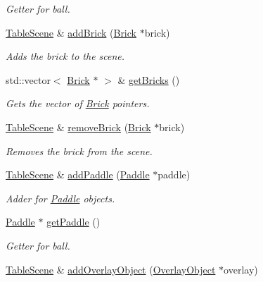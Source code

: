 \begin{DoxyCompactItemize}
\begin{DoxyCompactList}\small\item\em Getter for ball. \end{DoxyCompactList}\item 
\hyperlink{class_table_scene}{Table\+Scene} \& \hyperlink{class_table_scene_a617500b63b8d660a6f4f2807bb78a3e5}{add\+Brick} (\hyperlink{class_brick}{Brick} $\ast$brick)
\begin{DoxyCompactList}\small\item\em Adds the brick to the scene. \end{DoxyCompactList}\item 
std\+::vector$<$ \hyperlink{class_brick}{Brick} $\ast$ $>$ \& \hyperlink{class_table_scene_ab49b9da80894742da850699e9d09ae50}{get\+Bricks} ()
\begin{DoxyCompactList}\small\item\em Gets the vector of \hyperlink{class_brick}{Brick} pointers. \end{DoxyCompactList}\item 
\hyperlink{class_table_scene}{Table\+Scene} \& \hyperlink{class_table_scene_afea73d45fab7221c91177d9b7b385b63}{remove\+Brick} (\hyperlink{class_brick}{Brick} $\ast$brick)
\begin{DoxyCompactList}\small\item\em Removes the brick from the scene. \end{DoxyCompactList}\item 
\hypertarget{class_table_scene_abacaa9ebff0060101dfd63c948c661af}{\hyperlink{class_table_scene}{Table\+Scene} \& \hyperlink{class_table_scene_abacaa9ebff0060101dfd63c948c661af}{add\+Paddle} (\hyperlink{class_paddle}{Paddle} $\ast$paddle)}\label{class_table_scene_abacaa9ebff0060101dfd63c948c661af}

\begin{DoxyCompactList}\small\item\em Adder for \hyperlink{class_paddle}{Paddle} objects. \end{DoxyCompactList}\item 
\hypertarget{class_table_scene_a889ae59e16d18200d13ec81d47b3aba5}{\hyperlink{class_paddle}{Paddle} $\ast$ \hyperlink{class_table_scene_a889ae59e16d18200d13ec81d47b3aba5}{get\+Paddle} ()}\label{class_table_scene_a889ae59e16d18200d13ec81d47b3aba5}

\begin{DoxyCompactList}\small\item\em Getter for ball. \end{DoxyCompactList}\item 
\hypertarget{class_table_scene_aefde46bcdf0513f10b1d3dc62b60cbc9}{\hyperlink{class_table_scene}{Table\+Scene} \& \hyperlink{class_table_scene_aefde46bcdf0513f10b1d3dc62b60cbc9}{add\+Overlay\+Object} (\hyperlink{class_overlay_object}{Overlay\+Object} $\ast$overlay)}\label{class_table_scene_aefde46bcdf0513f10b1d3dc62b60cbc9}


\end{DoxyCompactItemize}
